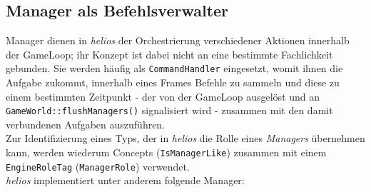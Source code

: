 \subsection{Manager als Befehlsverwalter}\label{sec:runtime_manager}

Manager dienen in \textit{helios} der Orchestrierung verschiedener Aktionen innerhalb der GameLoop; ihr Konzept ist dabei nicht an eine bestimmte Fachlichkeit gebunden.
Sie werden häufig als \texttt{CommandHandler} eingesetzt, womit ihnen die Aufgabe zukommt, innerhalb eines Frames Befehle zu sammeln und diese zu einem bestimmten Zeitpunkt - der von der GameLoop ausgelöst und an \texttt{GameWorld::flushManagers()} signalisiert wird - zusammen mit den damit verbundenen Aufgaben auszuführen.\\

Zur Identifizierung eines Typs, der in \textit{helios} die Rolle eines \textit{Managers} übernehmen kann, werden wiederum Concepts (\texttt{IsManagerLike}) zusammen mit einem \texttt{EngineRoleTag} (\texttt{ManagerRole}) verwendet.\\

\textit{helios} implementiert unter anderem folgende Manager:


